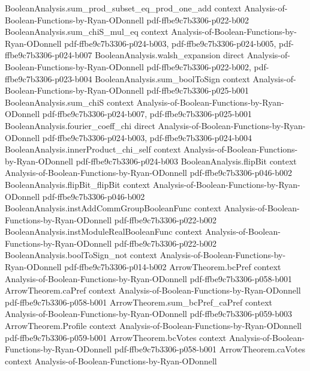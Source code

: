 \begin{lemma}
\proofstep
  {BooleanAnalysis.sum_prod_subset_eq_prod_one_add}
  {context}
  {Analysis-of-Boolean-Functions-by-Ryan-ODonnell}
  {pdf-ffbe9c7b3306-p022-b002}
\proofstep
  {BooleanAnalysis.sum_chiS_mul_eq}
  {context}
  {Analysis-of-Boolean-Functions-by-Ryan-ODonnell}
  {pdf-ffbe9c7b3306-p024-b003,
    pdf-ffbe9c7b3306-p024-b005,
    pdf-ffbe9c7b3306-p024-b007}
\proofstep
  {BooleanAnalysis.walsh_expansion}
  {direct}
  {Analysis-of-Boolean-Functions-by-Ryan-ODonnell}
  {pdf-ffbe9c7b3306-p022-b002,
    pdf-ffbe9c7b3306-p023-b004}
\proofstep
  {BooleanAnalysis.sum_boolToSign}
  {context}
  {Analysis-of-Boolean-Functions-by-Ryan-ODonnell}
  {pdf-ffbe9c7b3306-p025-b001}
\proofstep
  {BooleanAnalysis.sum_chiS}
  {context}
  {Analysis-of-Boolean-Functions-by-Ryan-ODonnell}
  {pdf-ffbe9c7b3306-p024-b007,
    pdf-ffbe9c7b3306-p025-b001}
\proofstep
  {BooleanAnalysis.fourier_coeff_chi}
  {direct}
  {Analysis-of-Boolean-Functions-by-Ryan-ODonnell}
  {pdf-ffbe9c7b3306-p024-b003,
    pdf-ffbe9c7b3306-p024-b004}
\proofstep
  {BooleanAnalysis.innerProduct_chi_self}
  {context}
  {Analysis-of-Boolean-Functions-by-Ryan-ODonnell}
  {pdf-ffbe9c7b3306-p024-b003}
\proofstep
  {BooleanAnalysis.flipBit}
  {context}
  {Analysis-of-Boolean-Functions-by-Ryan-ODonnell}
  {pdf-ffbe9c7b3306-p046-b002}
\proofstep
  {BooleanAnalysis.flipBit_flipBit}
  {context}
  {Analysis-of-Boolean-Functions-by-Ryan-ODonnell}
  {pdf-ffbe9c7b3306-p046-b002}
\proofstep
  {BooleanAnalysis.instAddCommGroupBooleanFunc}
  {context}
  {Analysis-of-Boolean-Functions-by-Ryan-ODonnell}
  {pdf-ffbe9c7b3306-p022-b002}
\proofstep
  {BooleanAnalysis.instModuleRealBooleanFunc}
  {context}
  {Analysis-of-Boolean-Functions-by-Ryan-ODonnell}
  {pdf-ffbe9c7b3306-p022-b002}
\proofstep
  {BooleanAnalysis.boolToSign_not}
  {context}
  {Analysis-of-Boolean-Functions-by-Ryan-ODonnell}
  {pdf-ffbe9c7b3306-p014-b002}
\proofstep
  {ArrowTheorem.bcPref}
  {context}
  {Analysis-of-Boolean-Functions-by-Ryan-ODonnell}
  {pdf-ffbe9c7b3306-p058-b001}
\proofstep
  {ArrowTheorem.caPref}
  {context}
  {Analysis-of-Boolean-Functions-by-Ryan-ODonnell}
  {pdf-ffbe9c7b3306-p058-b001}
\proofstep
  {ArrowTheorem.sum_bcPref_caPref}
  {context}
  {Analysis-of-Boolean-Functions-by-Ryan-ODonnell}
  {pdf-ffbe9c7b3306-p059-b003}
\proofstep
  {ArrowTheorem.Profile}
  {context}
  {Analysis-of-Boolean-Functions-by-Ryan-ODonnell}
  {pdf-ffbe9c7b3306-p059-b001}
\proofstep
  {ArrowTheorem.bcVotes}
  {context}
  {Analysis-of-Boolean-Functions-by-Ryan-ODonnell}
  {pdf-ffbe9c7b3306-p058-b001}
\proofstep
  {ArrowTheorem.caVotes}
  {context}
  {Analysis-of-Boolean-Functions-by-Ryan-ODonnell}

\end{lemma}
